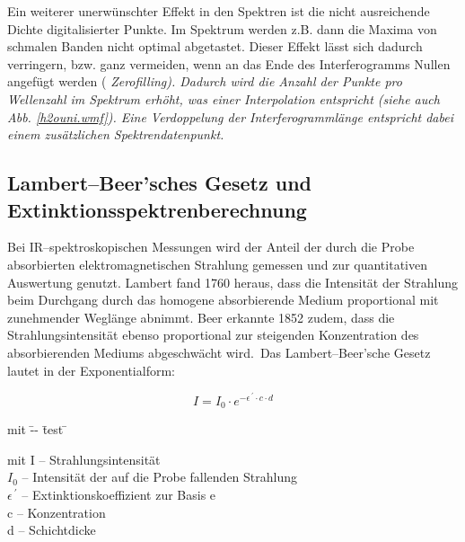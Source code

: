 Ein weiterer unerwünschter Effekt in den Spektren ist die nicht
ausreichende Dichte digitalisierter Punkte. Im Spektrum werden
z.B. dann die Maxima von schmalen Banden nicht optimal abgetastet.
Dieser Effekt lässt sich dadurch verringern, bzw. ganz vermeiden,
wenn an das Ende des Interferogramms Nullen angefügt werden (\it
Zerofilling\rm ). Dadurch wird die Anzahl der Punkte pro
Wellenzahl im Spektrum erhöht, was einer Interpolation entspricht
(siehe auch Abb. \ref{h2ouni.wmf}). Eine Verdoppelung der
Interferogrammlänge entspricht dabei einem zusätzlichen
Spektrendatenpunkt.\\


\subsection{\label{lambertbeer}Lambert--Beer'sches Gesetz und Extinktionsspektrenberechnung}

Bei IR--spektroskopischen Messungen wird der Anteil der durch die
Probe absorbierten elektromagnetischen Strahlung gemessen und zur
quantitativen Auswertung genutzt. Lambert fand 1760 heraus, dass
die Intensität der Strahlung beim Durchgang durch das homogene
absorbierende Medium proportional mit zunehmender Weglänge
abnimmt. Beer erkannte 1852 zudem, dass die Strahlungsintensität
ebenso proportional zur steigenden Konzentration des
absorbierenden Mediums abgeschwächt wird.\ Das Lambert--Beer'sche
Gesetz lautet in der Exponentialform:

\begin{equation}\label{eqlb}
  I=I_0 \cdot e^{-\epsilon^{\:\prime} \cdot c \cdot d}
\end{equation}

\begin{tabbing}
mit \quad \=-- \=test \=\kill

mit \> I \> -- \> Strahlungsintensität\\

\> $I_0$ \> -- \> Intensität der auf die Probe fallenden
Strahlung\\

\> $\epsilon^{\:\prime}$ \> -- \> Extinktionskoeffizient zur Basis
e\\

\> c \> -- \>Konzentration \\

\> d \> -- \> Schichtdicke\\
\end{tabbing}


